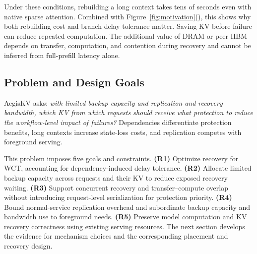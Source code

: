 Under these conditions, rebuilding a long context takes tens of seconds
even with native sparse attention. Combined with
Figure~\ref{fig:motivation}(), this shows why both
rebuilding cost and branch delay tolerance matter. Saving KV before
failure can reduce repeated computation. The additional value of DRAM
or peer HBM depends on transfer, computation, and contention during
recovery and cannot be inferred from full-prefill latency alone.

\subsection{Problem and Design Goals}
\label{sec:motivation-goals}

AegisKV asks: \emph{with limited backup capacity and replication and
recovery bandwidth, which KV from which requests should receive what
protection to reduce the workflow-level impact of failures?}
Dependencies differentiate protection benefits, long contexts increase
state-loss costs, and replication competes with foreground serving.

This problem imposes five goals and constraints.
\textbf{(R1)} Optimize recovery for WCT, accounting for dependency-induced
delay tolerance.
\textbf{(R2)} Allocate limited backup capacity across requests and their
KV to reduce exposed recovery waiting.
\textbf{(R3)} Support concurrent recovery and transfer--compute overlap
without introducing request-level serialization for protection priority.
\textbf{(R4)} Bound normal-service replication overhead and subordinate
backup capacity and bandwidth use to foreground needs.
\textbf{(R5)} Preserve model computation and KV recovery correctness using
existing serving resources.
The next section develops the evidence for mechanism choices and the
corresponding placement and recovery design.
